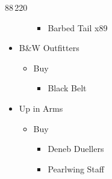 \begin{shop}{88\,220}
\begin{itemize}
\begin{itemize}
\begin{itemize}
						\item Barbed Tail x89
					\end{itemize}
			\end{itemize}
		\item B\&W Outfitters
			\begin{itemize}
				\item Buy
					\begin{itemize}
						\item Black Belt
					\end{itemize}
			\end{itemize}
		\item Up in Arms
			\begin{itemize}
				\item Buy
					\begin{itemize}
						\item Deneb Duellers
						\item Pearlwing Staff
					\end{itemize}
			\end{itemize}
	\end{itemize}
\end{shop}

